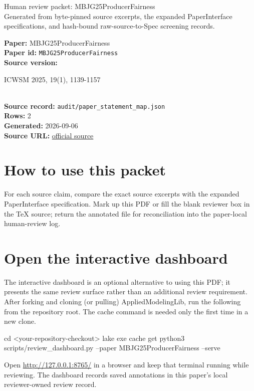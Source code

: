 \documentclass[10pt]{article}
\begin{document}
\fontsize{9}{10}\selectfont

\begin{center}
{\LARGE Human review packet: MBJG25ProducerFairness}\\[0.35em]
\small Generated from byte-pinned source excerpts, the expanded PaperInterface
specifications, and hash-bound raw-source-to-Spec screening records.
\end{center}

\noindent\textbf{Paper:} MBJG25ProducerFairness\\
\textbf{Paper id:} \texttt{MBJG25ProducerFairness}\\
\textbf{Source version:} \parbox[t]{0.76\linewidth}{\raggedright ICWSM 2025, 19(1), 1139-1157}\\
\textbf{Source record:} \texttt{audit/paper\_statement\_map.json}\\
\textbf{Rows:} 2\\
\textbf{Generated:} 2026-09-06\\
\textbf{Source URL:} \href{https://ojs.aaai.org/index.php/ICWSM/article/view/35865}{official source}





\section*{How to use this packet}
For each source claim, compare the exact source excerpts with the expanded
PaperInterface specification. Mark up this PDF or fill the blank reviewer box in the TeX source;
return the annotated file for reconciliation into the paper-local human-review
log.

\section*{Open the interactive dashboard}
The interactive dashboard is an optional alternative to using this PDF; it
presents the same review surface rather than an additional review requirement.
After forking and cloning (or pulling) AppliedModelingLib, run the following from the
repository root. The cache command is needed only the first time in a new clone.
\begin{ReviewVerbatim}
cd <your-repository-checkout>
lake exe cache get
python3 scripts/review_dashboard.py --paper MBJG25ProducerFairness --serve
\end{ReviewVerbatim}
Open \url{http://127.0.0.1:8765/} in a browser and keep that terminal running
while reviewing. The dashboard records saved annotations in this paper's local
reviewer-owned review record.
\end{document}
